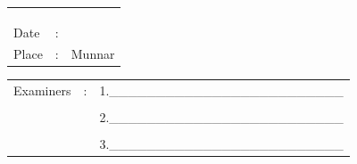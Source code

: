 \vfill
\begin{minipage}[t]{0.3\textwidth}%
\begin{tabular}{lcc}
 &  & \tabularnewline
 &  & \tabularnewline
 &  & \tabularnewline
Date & : & \tabularnewline
Place &: & Munnar\tabularnewline
\end{tabular}%
\end{minipage}\hspace{2cm}
\begin{minipage}[t]{0.4\textwidth}%
\noindent %
\begin{tabular}{ccr}
Examiners & :& 1.\_\_\_\_\_\_\_\_\_\_\_\_\_\_\_\_\_\_\_\_\_\_\_\_\_\\
&  & \\
&  & 2.\_\_\_\_\_\_\_\_\_\_\_\_\_\_\_\_\_\_\_\_\_\_\_\_\_\\
 &  & \\
&  & 3.\_\_\_\_\_\_\_\_\_\_\_\_\_\_\_\_\_\_\_\_\_\_\_\_\_\\
\end{tabular}%
\end{minipage}
